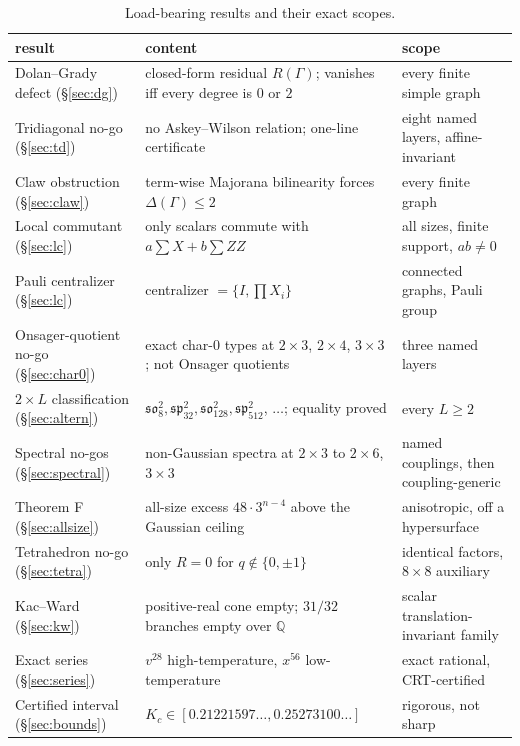 \documentclass[11pt]{article}
\theoremstyle{definition}
\newcommand{\Qb}{\mathbb{Q}}
\begin{document}
\begin{table}[h]
\centering
\small
\begin{tabular}{@{}p{}p{}p{}@{}}
\toprule
result & content & scope \\ \midrule
Dolan--Grady defect (\S\ref{sec:dg}) & closed-form residual $R(\Gamma)$; vanishes iff every degree is
$0$ or $2$ & every finite simple graph \\
Tridiagonal no-go (\S\ref{sec:td}) & no Askey--Wilson relation; one-line certificate & eight named
layers, affine-invariant \\
Claw obstruction (\S\ref{sec:claw}) & term-wise Majorana bilinearity forces $\Delta(\Gamma)\le2$ &
every finite graph \\
Local commutant (\S\ref{sec:lc}) & only scalars commute with $a\sum X+b\sum ZZ$ & all sizes, finite
support, $ab\ne0$ \\
Pauli centralizer (\S\ref{sec:lc}) & centralizer $=\{I,\prod X_i\}$ & connected graphs, Pauli group \\
Onsager-quotient no-go (\S\ref{sec:char0}) & exact char-$0$ types at $2\times3$, $2\times4$,
$3\times3$; not Onsager quotients & three named layers \\
$2\times L$ classification (\S\ref{sec:altern}) & $\mathfrak{so}_8^{2},\mathfrak{sp}_{32}^{2},
\mathfrak{so}_{128}^{2},\mathfrak{sp}_{512}^{2}$, $\ldots$; equality proved & every $L\ge2$ \\
Spectral no-gos (\S\ref{sec:spectral}) & non-Gaussian spectra at $2\times3$ to $2\times6$,
$3\times3$ & named couplings, then coupling-generic \\
Theorem F (\S\ref{sec:allsize}) & all-size excess $48\cdot3^{n-4}$ above the Gaussian ceiling &
anisotropic, off a hypersurface \\
Tetrahedron no-go (\S\ref{sec:tetra}) & only $R=0$ for $q\notin\{0,\pm1\}$ & identical factors,
$8\times8$ auxiliary \\
Kac--Ward (\S\ref{sec:kw}) & positive-real cone empty; $31/32$ branches empty over $\Qb$ & scalar
translation-invariant family \\
Exact series (\S\ref{sec:series}) & $v^{28}$ high-temperature, $x^{56}$ low-temperature & exact
rational, CRT-certified \\
Certified interval (\S\ref{sec:bounds}) & $K_c\in[0.21221597\ldots,0.25273100\ldots]$ & rigorous,
not sharp \\
\bottomrule
\end{tabular}
\caption{Load-bearing results and their exact scopes.}
\label{tab:summary}
\end{table}
\end{document}
